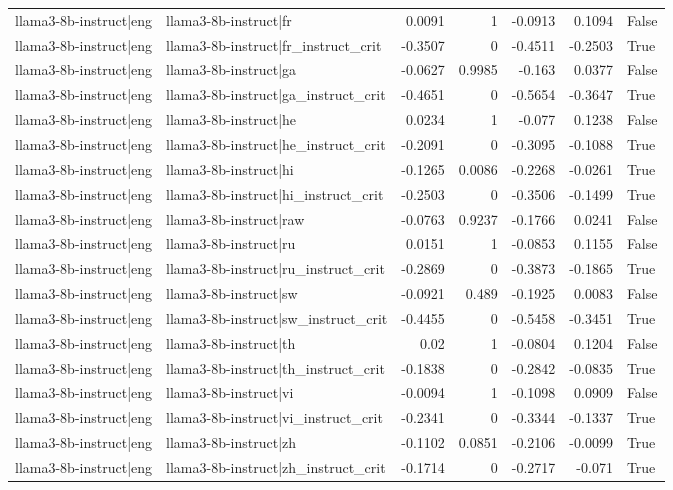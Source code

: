 \begin{table}
\begin{tabular}{l l r r r r l}
llama3-8b-instruct|eng & llama3-8b-instruct|fr & 0.0091 & 1 & -0.0913 & 0.1094 & False \\
llama3-8b-instruct|eng & llama3-8b-instruct|fr_instruct_crit & -0.3507 & 0 & -0.4511 & -0.2503 & True \\
llama3-8b-instruct|eng & llama3-8b-instruct|ga & -0.0627 & 0.9985 & -0.163 & 0.0377 & False \\
llama3-8b-instruct|eng & llama3-8b-instruct|ga_instruct_crit & -0.4651 & 0 & -0.5654 & -0.3647 & True \\
llama3-8b-instruct|eng & llama3-8b-instruct|he & 0.0234 & 1 & -0.077 & 0.1238 & False \\
llama3-8b-instruct|eng & llama3-8b-instruct|he_instruct_crit & -0.2091 & 0 & -0.3095 & -0.1088 & True \\
llama3-8b-instruct|eng & llama3-8b-instruct|hi & -0.1265 & 0.0086 & -0.2268 & -0.0261 & True \\
llama3-8b-instruct|eng & llama3-8b-instruct|hi_instruct_crit & -0.2503 & 0 & -0.3506 & -0.1499 & True \\
llama3-8b-instruct|eng & llama3-8b-instruct|raw & -0.0763 & 0.9237 & -0.1766 & 0.0241 & False \\
llama3-8b-instruct|eng & llama3-8b-instruct|ru & 0.0151 & 1 & -0.0853 & 0.1155 & False \\
llama3-8b-instruct|eng & llama3-8b-instruct|ru_instruct_crit & -0.2869 & 0 & -0.3873 & -0.1865 & True \\
llama3-8b-instruct|eng & llama3-8b-instruct|sw & -0.0921 & 0.489 & -0.1925 & 0.0083 & False \\
llama3-8b-instruct|eng & llama3-8b-instruct|sw_instruct_crit & -0.4455 & 0 & -0.5458 & -0.3451 & True \\
llama3-8b-instruct|eng & llama3-8b-instruct|th & 0.02 & 1 & -0.0804 & 0.1204 & False \\
llama3-8b-instruct|eng & llama3-8b-instruct|th_instruct_crit & -0.1838 & 0 & -0.2842 & -0.0835 & True \\
llama3-8b-instruct|eng & llama3-8b-instruct|vi & -0.0094 & 1 & -0.1098 & 0.0909 & False \\
llama3-8b-instruct|eng & llama3-8b-instruct|vi_instruct_crit & -0.2341 & 0 & -0.3344 & -0.1337 & True \\
llama3-8b-instruct|eng & llama3-8b-instruct|zh & -0.1102 & 0.0851 & -0.2106 & -0.0099 & True \\
llama3-8b-instruct|eng & llama3-8b-instruct|zh_instruct_crit & -0.1714 & 0 & -0.2717 & -0.071 & True \\

\end{tabular}
\end{table}
